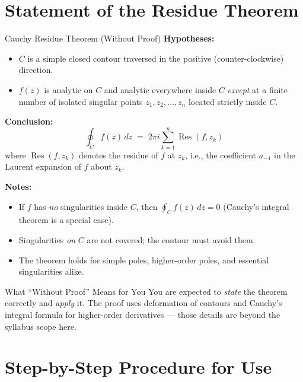\documentclass[12pt,a4paper]{article}
\begin{document}
\section{Statement of the Residue Theorem}

\begin{infobox}{Cauchy Residue Theorem (Without Proof)}
\textbf{Hypotheses:}
\begin{itemize}[noitemsep]
  \item $C$ is a simple closed contour traversed in the positive
        (counter-clockwise) direction.
  \item $f(z)$ is analytic on $C$ and analytic everywhere inside $C$
        \emph{except} at a finite number of isolated singular points
        $z_1, z_2, \ldots, z_n$ located strictly inside $C$.
\end{itemize}

\medskip
\textbf{Conclusion:}
\[
  \oint_{C} f(z)\,dz \;=\; 2\pi i \sum_{k=1}^{n} \operatorname{Res}(f, z_k)
\]
where $\operatorname{Res}(f, z_k)$ denotes the residue of $f$ at $z_k$, i.e.,
the coefficient $a_{-1}$ in the Laurent expansion of $f$ about $z_k$.

\medskip
\textbf{Notes:}
\begin{itemize}[noitemsep]
  \item If $f$ has \emph{no} singularities inside $C$, then
        $\oint_{C} f(z)\,dz = 0$ (Cauchy's integral theorem is a special case).
  \item Singularities \emph{on} $C$ are not covered; the contour must avoid them.
  \item The theorem holds for simple poles, higher-order poles, and essential
        singularities alike.
\end{itemize}
\end{infobox}

\begin{learnbox}{What ``Without Proof'' Means for You}
You are expected to \emph{state} the theorem correctly and \emph{apply} it.
The proof uses deformation of contours and Cauchy's integral formula for
higher-order derivatives --- those details are beyond the syllabus scope here.
\end{learnbox}

\section{Step-by-Step Procedure for Use}
\end{document}

